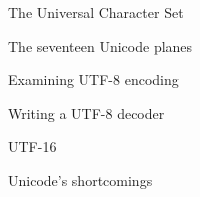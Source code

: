 \documentclass[../index.tex]{subfiles}
\begin{document}
\renewcommand{\currenttitle}{The Universal Character Set}
\begin{frame}{\currenttitle}
\end{frame}

\renewcommand{\currenttitle}{The seventeen Unicode planes}
\begin{frame}{\currenttitle}
\end{frame}

\renewcommand{\currenttitle}{Examining UTF-8 encoding}
\begin{frame}{\currenttitle}
\end{frame}

\renewcommand{\currenttitle}{Writing a UTF-8 decoder}
\begin{frame}{\currenttitle}
\end{frame}

\renewcommand{\currenttitle}{UTF-16}
\begin{frame}{\currenttitle}
\end{frame}

\renewcommand{\currenttitle}{Unicode's shortcomings}
\begin{frame}{\currenttitle}
\end{frame}

\end{document}
